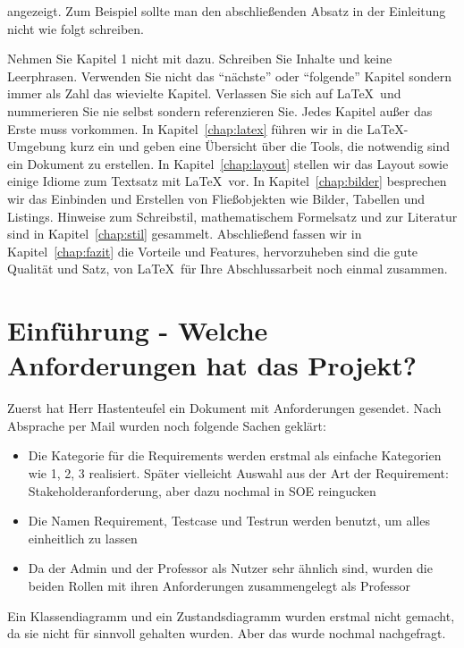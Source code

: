 \documentclass[11pt,a4paper]{report}
\begin{document}
 angezeigt. 
Zum Beispiel sollte man den abschließenden Absatz in der Einleitung 
nicht wie folgt schreiben.

Nehmen Sie Kapitel 1 nicht mit dazu. Schreiben Sie Inhalte und keine
Leerphrasen. Verwenden Sie nicht das "`nächste"' oder "`folgende"' Kapitel
sondern immer als Zahl das wievielte Kapitel. 
Verlassen Sie sich auf \LaTeX\ und nummerieren Sie nie selbst sondern
referenzieren Sie. Jedes Kapitel außer das Erste muss vorkommen. 
In Kapitel~\ref{chap:latex} führen wir in die \LaTeX-Umgebung kurz ein und 
geben eine Übersicht über die Tools, die notwendig sind ein Dokument zu 
erstellen.
In Kapitel~\ref{chap:layout} stellen wir das Layout sowie einige Idiome 
zum Textsatz mit \LaTeX\ vor. 
In Kapitel~\ref{chap:bilder} besprechen wir das Einbinden und Erstellen 
von Fließobjekten wie Bilder, Tabellen und Listings.
Hinweise zum Schreibstil, mathematischem Formelsatz und zur Literatur sind 
in Kapitel~\ref{chap:stil} gesammelt.
Abschließend fassen wir in Kapitel~\ref{chap:fazit} die Vorteile und Features,
hervorzuheben sind die gute Qualität und Satz,
von \LaTeX\ für Ihre Abschlussarbeit noch einmal zusammen.
\chapter{Einführung - Welche Anforderungen hat das Projekt?} \label{chap:Anforderungen}

Zuerst hat Herr Hastenteufel ein Dokument mit Anforderungen gesendet. Nach Absprache per Mail wurden noch folgende Sachen geklärt:
\begin{itemize}
\item Die Kategorie für die Requirements werden erstmal als einfache Kategorien wie 1, 2, 3 realisiert. Später vielleicht Auswahl aus der Art der Requirement: Stakeholderanforderung, aber dazu nochmal in SOE reingucken

\item Die Namen Requirement, Testcase und Testrun werden benutzt, um alles einheitlich zu lassen

\item Da der Admin und der Professor als Nutzer sehr ähnlich sind, wurden die beiden Rollen mit ihren Anforderungen zusammengelegt als Professor 
\end{itemize}


Ein Klassendiagramm und ein Zustandsdiagramm wurden erstmal nicht gemacht, da sie nicht für sinnvoll gehalten wurden. Aber das wurde nochmal nachgefragt.
\end{document}
